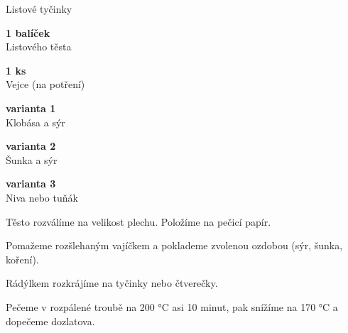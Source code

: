 \documentclass[11pt,a4paper]{article}
\begin{document}
\begin{recipe}[Goldenrod]{Listové tyčinky}
    \begin{ingredients}
        \item \parbox[t]{\linewidth}{\raggedright \piece \textbf{1 balíček}\\ Listového těsta}
        \item \parbox[t]{\linewidth}{\raggedright \piece \textbf{1 ks}\\ Vejce (na potření)}
        \item \parbox[t]{\linewidth}{\raggedright \indefinite \textbf{varianta 1}\\ Klobása a sýr}
        \item \parbox[t]{\linewidth}{\raggedright \indefinite \textbf{varianta 2}\\ Šunka a sýr}
        \item \parbox[t]{\linewidth}{\raggedright \indefinite \textbf{varianta 3}\\ Niva nebo tuňák}
    \end{ingredients}
    \begin{steps}
        \item Těsto rozválíme na velikost plechu. Položíme na pečicí papír.
        \item Pomažeme rozšlehaným vajíčkem a poklademe zvolenou ozdobou (sýr, šunka, koření).
        \item Rádýlkem rozkrájíme na tyčinky nebo čtverečky.
        \item Pečeme v rozpálené troubě na 200 °C asi 10 minut, pak snížíme na 170 °C a dopečeme dozlatova.
    \end{steps}
\end{recipe}
\end{document}
